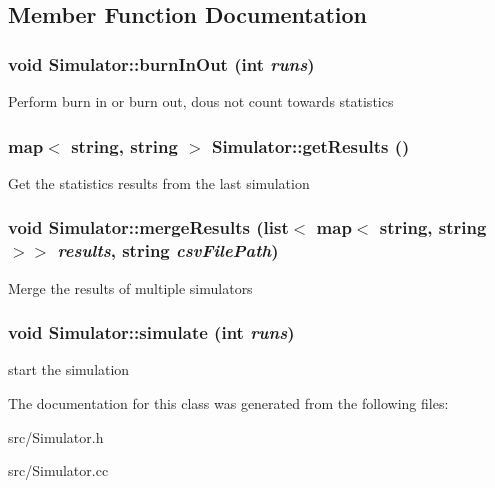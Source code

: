 \subsection{Member Function Documentation}
\hypertarget{classSimulator_a224de0acb821d6b4e333c1821bea57d9}{
\subsubsection[{burnInOut}]{\setlength{\rightskip}{0pt plus 5cm}void Simulator::burnInOut (int {\em runs})}}
\label{classSimulator_a224de0acb821d6b4e333c1821bea57d9}
Perform burn in or burn out, dous not count towards statistics \hypertarget{classSimulator_a510b4c3d8d032e7b5abf12e2572a8c5b}{
\subsubsection[{getResults}]{\setlength{\rightskip}{0pt plus 5cm}map$<$ string, string $>$ Simulator::getResults ()}}
\label{classSimulator_a510b4c3d8d032e7b5abf12e2572a8c5b}
Get the statistics results from the last simulation \hypertarget{classSimulator_a3c9f45bd002ee6b88b6ec4d55d65e0ff}{
\subsubsection[{mergeResults}]{\setlength{\rightskip}{0pt plus 5cm}void Simulator::mergeResults (list$<$ map$<$ string, string $>$$>$ {\em results}, \/  string {\em csvFilePath})}}
\label{classSimulator_a3c9f45bd002ee6b88b6ec4d55d65e0ff}
Merge the results of multiple simulators \hypertarget{classSimulator_a833eb17dd0d0d1b0b1f7c0747032c21c}{
\subsubsection[{simulate}]{\setlength{\rightskip}{0pt plus 5cm}void Simulator::simulate (int {\em runs})}}
\label{classSimulator_a833eb17dd0d0d1b0b1f7c0747032c21c}
start the simulation 

The documentation for this class was generated from the following files:\begin{DoxyCompactItemize}
\item 
src/Simulator.h\item 
src/Simulator.cc\end{DoxyCompactItemize}
